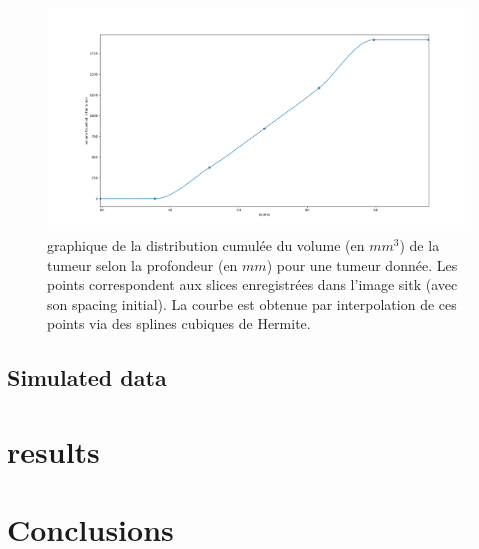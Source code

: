 \documentclass[10pt]{article}
\begin{document}
\begin{figure}[tbp]
    \centering
    \includegraphics[scale = 0.3]{./images/plot_depth_volume_2.png}
    \caption{graphique de la distribution cumulée du volume (en $mm^3$) de la tumeur selon la profondeur (en $mm$) pour une tumeur donnée. Les points correspondent aux slices enregistrées dans l'image sitk (avec son spacing initial). La courbe est obtenue par interpolation de ces points via des splines cubiques de Hermite.}
    \label{fig:depth_volume}
\end{figure}


\subsection{Simulated data}


\vspace{10 pt}













\vspace{2 cm}

\section{results}




\section*{Conclusions}
\blindtext





\end{document}
